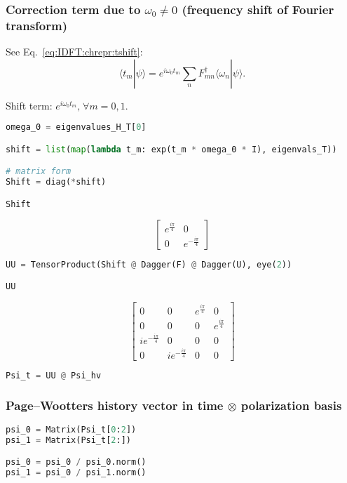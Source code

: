 \subsubsection*{Correction term due to $\omega_0 \neq 0$ (frequency shift of Fourier transform)}

See Eq.~\eqref{eq:IDFT:chrepr:tshift}:
\begin{equation}
  \langle{t_{m}}|{\psi}\rangle = e^{i\omega_{0}t_m} \sum_n F^{\dagger}_{mn} \langle{\omega_n}|{\psi}\rangle \text{.}
\end{equation}

Shift term: $e^{i\omega_{0}t_m} \text{,} \; \forall m = 0, 1$.

\begin{lstlisting}[language=Python]
omega_0 = eigenvalues_H_T[0]

shift = list(map(lambda t_m: exp(t_m * omega_0 * I), eigenvals_T))

# matrix form
Shift = diag(*shift)

Shift
\end{lstlisting}
$$
  \left[\begin{matrix}e^{\frac{i \pi}{4}} & 0\\0 & e^{- \frac{i \pi}{4}}\end{matrix}\right]
$$

\begin{lstlisting}[language=Python]
UU = TensorProduct(Shift @ Dagger(F) @ Dagger(U), eye(2))

UU
\end{lstlisting}
$$
  \left[\begin{matrix}0 & 0 & e^{\frac{i \pi}{4}} & 0\\0 & 0 & 0 & e^{\frac{i \pi}{4}}\\i e^{- \frac{i \pi}{4}} & 0 & 0 & 0\\0 & i e^{- \frac{i \pi}{4}} & 0 & 0\end{matrix}\right]
$$

\begin{lstlisting}[language=Python]
Psi_t = UU @ Psi_hv
\end{lstlisting}

\subsubsection*{Page--Wootters history vector in time $\otimes$ polarization basis}

\begin{lstlisting}[language=Python]
psi_0 = Matrix(Psi_t[0:2])
psi_1 = Matrix(Psi_t[2:])

psi_0 = psi_0 / psi_0.norm()
psi_1 = psi_0 / psi_1.norm()
\end{lstlisting}

